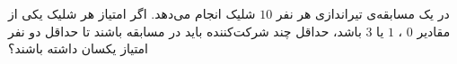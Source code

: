 \EXERCISE
در یک مسابقه‌ی تیراندازی هر نفر
$10$
شلیک انجام می‌دهد. اگر امتیاز هر شلیک یکی از مقادیر
$0$
،
$1$
یا
$3$
باشد، حداقل چند شرکت‌کننده باید در مسابقه باشند تا حداقل دو نفر امتیاز یکسان داشته باشند؟